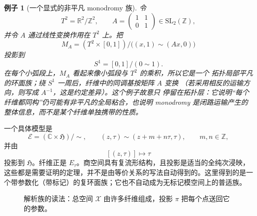 \documentclass[UTF8,fontset=none,a4paper,11pt]{ctexart}
\theoremstyle{foundation-definition}
\theoremstyle{foundation-theorem}
\theoremstyle{foundation-proposition}
\theoremstyle{foundation-example}
\newtheorem{example}[definition]{例子}
\theoremstyle{foundation-remark}
\theoremstyle{foundation-theorem}
\newcommand{\C}{\mathbb C}
\begin{document}
\begin{example}[一个显式的非平凡 monodromy 族]
令
\[
T^2=\mathbb R^2/\mathbb Z^2,\qquad
A=\begin{pmatrix}1&1\\0&1\end{pmatrix}\in\mathrm{SL}_2(\mathbb Z),
\]
并令 \(A\) 通过线性变换作用在 \(T^2\) 上。把
\[
M_A=(T^2\times[0,1])/
\bigl((x,1)\sim(Ax,0)\bigr)
\]
投影到
\[
S^1=[0,1]/(0\sim1).
\]
在每个小弧段上，\(M_A\) 看起来像小弧段与 \(T^2\) 的乘积，所以它是一个
拓扑局部平凡的环面族；绕 \(S^1\) 一周后，纤维中的同调基按矩阵 \(A\) 变换
（若采用相反的运输方向，则写成 \(A^{-1}\)，这是约定差异）。这个例子故意只
停留在拓扑层：它说明“每个纤维都同构”仍可能有非平凡的全局粘合，也说明
monodromy 是闭路运输产生的整体信息，而不是某个纤维单独携带的性质。
\end{example}

一个具体模型是
\[
\mathcal E=(\C\times\mathfrak H)/\sim,
\qquad
(z,\tau)\sim(z+m+n\tau,\tau),\qquad m,n\in\mathbb Z,
\]
并由
\[
[(z,\tau)]\longmapsto\tau
\]
投影到 \(\mathfrak H\)。纤维正是 \(E_\tau\)。商空间具有复流形结构，且投影是适当的全纯次浸映，这些都是需要证明的定理，并不是由等价关系的写法自动得到的。这里得到的是一个带参数化（带标记）的复环面族；它也不自动成为无标记模空间上的普适族。

\begin{figure}[htbp]
\centering
{}
\caption{解析族的读法：总空间 \(\mathcal X\) 由许多纤维组成，投影 \(\pi\) 把每个点送回它的参数。}
\label{fig:analytic-family}
\end{figure}
\end{document}
